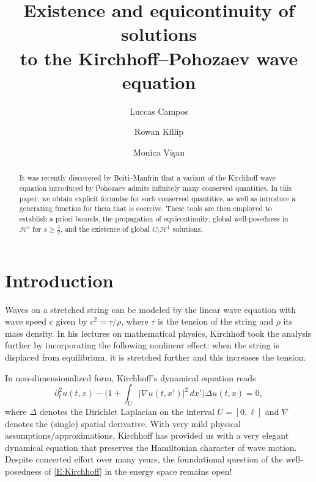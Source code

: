 \documentclass{amsart}
\title[The Kirchhoff--Pohozaev wave equation]{Existence and equicontinuity of solutions\\to the Kirchhoff--Pohozaev wave equation}
\author[L. Campos]{Luccas Campos}
\author[R. Killip]{Rowan Killip}
\author[M. Visan]{Monica Vi\c{s}an}
\theoremstyle{definition}
\numberwithin{equation}{section}
\begin{document}
\begin{abstract}
It was recently discovered by Boiti--Manfrin that a variant of the Kirchhoff wave equation introduced by Pohozaev admits infinitely many conserved quantities.
In this paper, we obtain explicit formulae for such conserved quantities, as well as introduce a generating function for them that is coercive.  These tools are then employed to  establish a priori bounds, the propagation of equicontinuity, global well-posedness in $\mathcal H^s$ for $s\geq \frac32$, and the existence of global $C_t \mathcal H^1$ solutions.  
\end{abstract}


\maketitle
\section{Introduction}

Waves on a stretched string can be modeled by the linear wave equation with wave speed $c$ given by $c^2=\tau/\rho$, where $\tau$ is the tension of the string and $\rho$ its mass density.  In his lectures \cite{Kirchhoff97} on mathematical physics, Kirchhoff took the analysis further by incorporating the following nonlinear effect: when the string is displaced from equilibrium, it is stretched further and this increases the tension.

In non-dimensionalized form, Kirchhoff's dynamical equation reads
\begin{equation}\label{E:Kirchhoff}
\partial_{t}^2 u(t,x) - \biggl(1+ \int_U |\nabla u(t,x')|^2\, dx'\biggr)  \Delta u(t,x)=0,
\end{equation}
where $\Delta$ denotes the Dirichlet Laplacian on the interval $U=[0,\ell]$ and $\nabla$ denotes the (single) spatial derivative.
With very mild physical assumptions/approximations, Kirchhoff has provided us with a very elegant dynamical equation that preserves the Hamiltonian character of wave motion.  Despite concerted effort over many years, the foundational question of the well-posedness of \eqref{E:Kirchhoff} in the energy space remains open!
\end{document}

